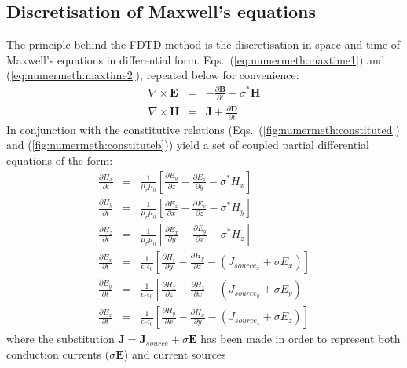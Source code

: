 \documentclass[a4paper, 12pt]{article}
\newcommand{\eqs}[2]{Eqs.\ (\ref{#1}) and (\ref{#2})}
\begin{document}
	\subsection{Discretisation of Maxwell's equations}
	The principle behind the FDTD method is the discretisation in space
	and time of Maxwell's equations in differential
	form. \eqs{eq:numermeth:maxtime1}{eq:numermeth:maxtime2}, repeated
	below for convenience:
	\begin{eqnarray}
		\nabla\times\mathbf{E}&=&-\frac{\partial\mathbf{B}}{\partial t}-\sigma^*\mathbf{H}\nonumber\\
		\nabla\times\mathbf{H}&=&\mathbf{J} + \frac{\partial\mathbf{D}}{\partial t}\nonumber
	\end{eqnarray}
	In conjunction with the constitutive relations
	(\eqs{fig:numermeth:constituted}{fig:numermeth:constituteb}) yield a
	set of coupled partial differential equations of the form:
	\begin{eqnarray}
		\label{eq:fdtd:pdes1}
		\frac{\partial H_x}{\partial t}&=&\frac{1}{\mu_r\mu_0}\left[\frac{\partial E_y}{\partial z}
		-\frac{\partial E_z}{\partial y} - \sigma^*H_x  \right]\\
		\label{eq:fdtd:pdes2}
		\frac{\partial H_y}{\partial t}&=&\frac{1}{\mu_r\mu_0}\left[\frac{\partial E_z}{\partial x}
		-\frac{\partial E_x}{\partial z} - \sigma^*H_y  \right]\\
		\label{eq:fdtd:pdes3}
		\frac{\partial H_z}{\partial t}&=&\frac{1}{\mu_r\mu_0}\left[\frac{\partial E_x}{\partial y}
		-\frac{\partial E_y}{\partial x} - \sigma^*H_z  \right]\\
		\label{eq:fdtd:pdes4}
		\frac{\partial E_x}{\partial t}&=&\frac{1}{\epsilon_r\epsilon_0}\left[\frac{\partial H_z}{\partial y}
		-\frac{\partial H_y}{\partial z} - \left(J_{source_x}+\sigma
		E_x\right)  \right]\\
		\label{eq:fdtd:pdes5}
		\frac{\partial E_y}{\partial t}&=&\frac{1}{\epsilon_r\epsilon_0}\left[\frac{\partial H_x}{\partial z}
		-\frac{\partial H_z}{\partial x} - \left(J_{source_y}+\sigma
		E_y\right)  \right]\\
		\label{eq:fdtd:pdes6}
		\frac{\partial E_z}{\partial t}&=&\frac{1}{\epsilon_r\epsilon_0}\left[\frac{\partial H_y}{\partial x}
		-\frac{\partial H_x}{\partial y} - \left(J_{source_z}+\sigma E_z\right)  \right]
	\end{eqnarray}
	where the substitution $\mathbf{J} = \mathbf{J}_{source} +
	\sigma\mathbf{E}$ has been made in order to represent both conduction
	currents ($\sigma\mathbf{E}$) and current sources
\end{document}
